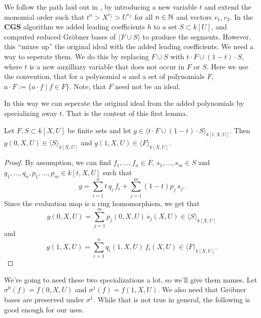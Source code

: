 We follow the path laid out in \cite{ss_algo}, by introducing a new variable $t$ and extend the monomial order such that $t^{n} > X^{v_{1}} > U^{v_{2}}$ for all $n \in \mathbb{N}$ and vectors $v_{1}, v_{2}$. In the $\mathbf{CGS}$ algorithm we added leading coefficients $h$ to a set $S \subset k[U]$, and computed reduced Gröbner bases of $\langle F \cup S \rangle$ to produce the segments. However, this ``mixes up'' the original ideal with the added leading coefficients. We need a way to seperate them. We do this by replacing $F \cup S$ with $t\cdot F \cup (1-t)\cdot S$, where $t$ is a new auxilliary variable that does not occur in $F$ or $S$. Here we use the convention, that for a polynomial $a$ and a set of polynomials $F$, $a\cdot F := \{a \cdot f \mid f \in F\}$. Note, that $F$ need not be an ideal.

In this way we can seperate the original ideal from the added polynomials by specializing away $t$. That is the content of this first lemma.

\begin{lemma}\label{lem:seperation}
  Let $F, S \subset k[X, U]$ be finite sets and let $g \in \langle t\cdot F \cup (1-t)\cdot S \rangle_{k[t, X, U]}$. Then $g(0, X, U) \in \langle S \rangle_{k[X, U]}$ and $g(1, X, U) \in \langle F \rangle_{k[X, U]}$.
\end{lemma}
\begin{proof}
  By assumption, we can find $f_{1}, \dots, f_{n} \in F$, $s_{1}, \dots, s_{m} \in S$ and $q_{1}, \dots, q_{n}, p_{1}, \dots, p_{m} \in k[t, X, U]$ such that
  \[g = \sum_{i=1}^{n} t\, q_{i}\, f_{i} + \sum_{j=1}^{m} (1 - t) p_{j}\, s_{j}.\]
  Since the evaluation map is a ring homomorphism, we get that
  \[g(0, X, U) = \sum_{j=1}^{m} p_{j}(0, X, U)\, s_{j}(X, U) \in \langle S \rangle_{k[X, U]}\]
  and
  \[g(1, X, U) = \sum_{i=1}^{n} q_{i}(1, X, U)\, f_{i}(X, U) \in \langle F \rangle_{k[X, U]}.\]
\end{proof}

We're going to need these two specializations a lot, so we'll give them names. Let $\sigma^{0}(f) = f(0, X, U)$ and $\sigma^{1}(f) = f(1, X, U)$. We also need that Gröbner bases are preserved under $\sigma^{1}$. While that is not true in general, the following is good enough for our uses.

